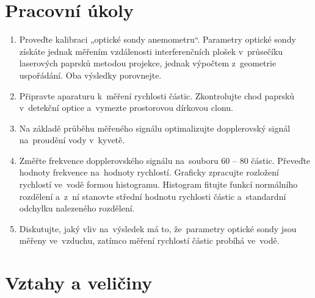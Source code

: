 \documentclass{../concepts/titul_zprava_p/prepareprotokolZprava} %
\begin{document}
\renewcommand{\figurename}{Graf}
\renewcommand{\refname}{Literatura}
\renewcommand{\today}{\number\day.\,\number\month.\,\number\year}

\graphicspath{{../concepts/titul_protokol_p/}}
\maketitle

\section{Pracovní úkoly}
\begin{enumerate}
    \item Proveďte kalibraci „optické sondy anemometru“. Parametry optické sondy získáte jednak měřením vzdálenosti 
    interferenčních plošek v~průsečíku laserových paprsků metodou projekce, jednak výpočtem z~geometrie uspořádání. 
    Oba výsledky porovnejte.
    \item Připravte aparaturu k~měření rychlosti částic. Zkontrolujte chod paprsků v~detekční optice a~vymezte prostorovou 
    dírkovou clonu.
    \item Na základě průběhu měřeného signálu optimalizujte dopplerovský signál na~proudění vody v~kyvetě.
    \item Změřte frekvence dopplerovského signálu na~souboru 60 -- 80 částic. Převeďte hodnoty frekvence na~hodnoty rychlostí. 
    Graficky zpracujte rozložení rychlostí ve~vodě formou histogramu. Histogram fitujte funkcí normálního rozdělení a~z~ní 
    stanovte střední hodnotu rychlosti částic a~standardní odchylku nalezeného rozdělení.
    \item Diskutujte, jaký vliv na~výsledek má to, že~parametry optické sondy jsou měřeny ve~vzduchu, zatímco měření rychlostí 
    částic probíhá ve~vodě.
\end{enumerate}

\section{Vztahy a veličiny}

\end{document}
